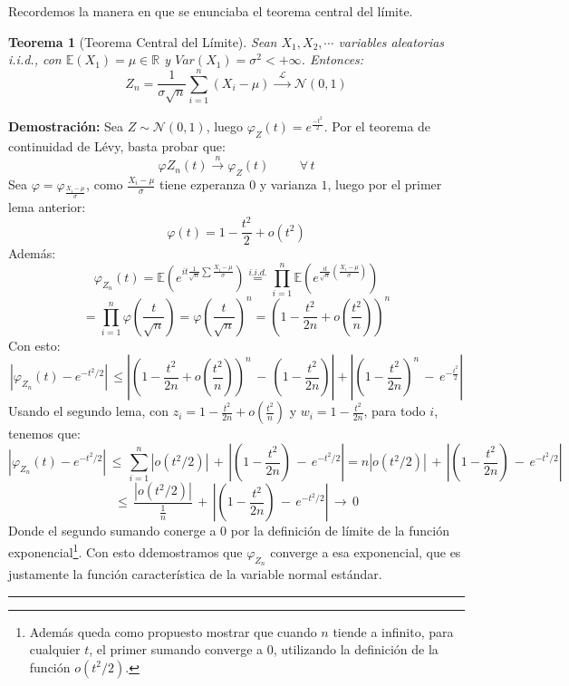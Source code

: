 \documentclass[a4paper]{article}
\newtheorem{teorema}{Teorema}
\numberwithin{equation}{subsection}
\numberwithin{definicion}{subsection}
\def\R{\mathbb R}
\def\E{\mathbb E}
\begin{document}
Recordemos la manera en que se enunciaba el teorema central del límite.
\begin{teorema}[Teorema Central del Límite] Sean $X_1,X_2,\cdots$ variables aleatorias \textit{i.i.d.}, con $\E(X_1)=\mu\in\R$ y $Var(X_1)=\sigma^2<+\infty$. Entonces:
\[Z_n = \frac{1}{\sigma \sqrt{n}}\sum_{i=1}^{n}\left(X_i-\mu\right)\,\xrightarrow{\,\,\mathcal{L}\,\,}\,\mathcal{N}(0,1)\]
\end{teorema}
\textbf{Demostración: }Sea $Z\sim \mathcal{N}(0,1)$, luego $\varphi_Z(t) = e^{\frac{-t^2}{2}}$. Por el teorema de continuidad de Lévy, basta probar que:
\[\varphi{Z_n}(t)\xrightarrow{\,\,n\,\,}\varphi_Z(t)\hspace{1cm}\forall\,t\]
Sea $\varphi = \varphi_{\frac{X_i-\mu}{\sigma}}$, como $\frac{X_i-\mu}{\sigma}$ tiene ezperanza $0$ y varianza $1$, luego por el primer lema anterior:
\[\varphi(t) = 1-\frac{t^2}{2} + o(t^2)\]
Además: 
\[\varphi_{Z_n}(t) = \E(e^{it\frac{1}{\sqrt{n}}\sum\frac{X_i-\mu}{\sigma}}) \overset{i.i.d.}{=} \prod_{i=1}^n\E\left(e^{\frac{it}{\sqrt{n}}\left(\frac{X_i-\mu}{\sigma}\right)}\right)\]
\[ = \prod_{i=1}^n \varphi(\frac{t}{\sqrt{n}}) = \varphi(\frac{t}{\sqrt{n}})^n = \left(1-\frac{t^2}{2n}+o(\frac{t^2}{n})\right)^n\]
Con esto:
\[\left|\varphi_{Z_n}(t) - e^{-t^2/2}\right|\,\leq \left|\left(1-\frac{t^2}{2n}+o(\frac{t^2}{n})\right)^n\,-\,\left(1-\frac{t^2}{2n}\right)\right| + \left|\left(1-\frac{t^2}{2n}\right)^n\,-\,e^{-\frac{t^2}{2}}\right|\]
Usando el segundo lema, con $z_i = 1-\frac{t^2}{2n}+o(\frac{t^2}{n})$ y $w_i = 1-\frac{t^2}{2n}$, para todo $i$, tenemos que:
\[\left|\varphi_{Z_n}(t) - e^{-t^2/2}\right|\,\leq\,\sum_{i=1}^n\left|o(t^2/2)\right| \,+\, \left|\left(1-\frac{t^2}{2n}\right)\,-\,e^{-t^2/2}\right| = n|o(t^2/2)|\,+\,\left|\left(1-\frac{t^2}{2n}\right)\,-\,e^{-t^2/2}\right|\]
\[\leq\,\frac{|o(t^2/2)|}{\frac{1}{n}}\,+\,\left|\left(1-\frac{t^2}{2n}\right)\,-\,e^{-t^2/2}\right|\,\rightarrow\,0\]
Donde el segundo sumando conerge a 0 por la definición de límite de la función exponencial\footnote{Además queda como propuesto mostrar que cuando $n$ tiende a infinito, para cualquier $t$, el primer sumando converge a 0, utilizando la definición de la función $o(t^2/2)$.}. Con esto ddemostramos que $\varphi_{Z_n}$ converge a esa exponencial, que es justamente la función característica de la variable normal estándar. \rule{0.7em}{0.7em}
\end{document}

